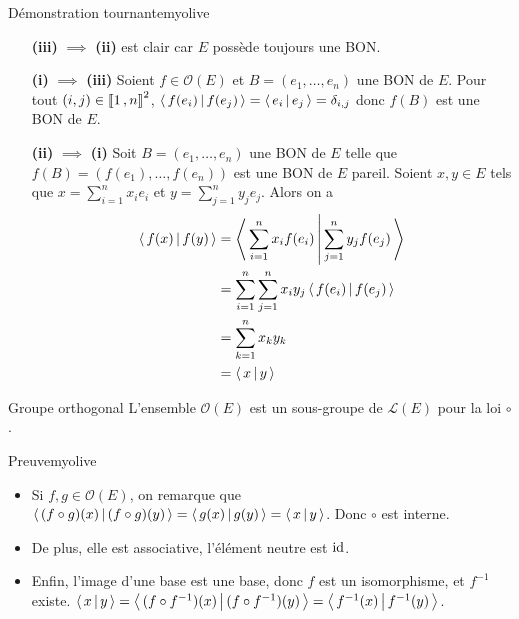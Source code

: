     \begin{demo}{Démonstration tournante}{myolive}
        \begin{itemize}[leftmargin=2cm]
            \item[\textbf{(iii)} $\implies$ \textbf{(ii)}] est clair car $E$ possède toujours une BON.
            \item[\textbf{(i)} $\implies$ \textbf{(iii)}] Soient $f \in \mathcal{O}(E)$ et $B = \left(e_1,\ldots,e_n\right)$ une BON de $E$. Pour tout $(i,j) \in \left\llbracket 1 \, , n \right\rrbracket^2$, $\left<\,f(e_i)\,\middle|\,f(e_j)\,\right> = \left<\,e_i\,\middle|\,e_j\,\right> = \delta_{i,j}$ donc $f(B)$ est une BON de $E$.
            \item[\textbf{(ii)} $\implies$ \textbf{(i)}] Soit $B = (e_1,\ldots,e_n)$ une BON de $E$ telle que $f(B) = \left(f(e_1), \ldots, f(e_n)\right)$ est une BON de $E$ pareil. Soient $x,y \in E$ tels que $x = \sum_{i=1}^{n} x_i e_i$ et $y = \sum_{j=1}^{n} y_j e_j$. Alors on a 
            \begin{align*}
                \left<\,f(x)\,\middle|\,f(y)\,\right> 
                &= \left<\,\sum_{i=1}^{n} x_i f(e_i)\,\middle|\,\sum_{j=1}^{n} y_j f(e_j)\,\right> \\
                &= \sum_{i=1}^{n} \sum_{j=1}^{n} x_i y_j \left<\,f(e_i)\,\middle|\,f(e_j)\,\right> \\
                &= \sum_{k=1}^{n} x_k y_k \\
                &= \left<\,x\,\middle|\,y\,\right>
            \end{align*}
        \end{itemize}
    \end{demo}

    \begin{prop}{Groupe orthogonal}{}
        L’ensemble $\mathcal{O}(E)$ est un sous-groupe de $\mathcal{L}(E)$ pour la loi $\circ$.
    \end{prop}

    \begin{demo}{Preuve}{myolive}
        \begin{itemize}
            \item Si $f,g \in \mathcal{O}(E)$, on remarque que $\left<\,(f \circ g)(x)\,\middle|\,(f \circ g)(y)\,\right> = \left<\,g(x)\,\middle|\,g(y)\,\right> = \left<\,x\,\middle|\,y\,\right>$. Donc $\circ$ est interne. 
            \item De plus, elle est associative, l’élément neutre est $\operatorname{id}$.
            \item Enfin, l’image d’une base est une base, donc $f$ est un isomorphisme, et $f^{-1}$ existe. $\left<\,x\,\middle|\,y\,\right> = \left<\,(f \circ f^{-1})(x)\,\middle|\,(f \circ f^{-1})(y)\,\right> = \left<\,f^{-1}(x)\,\middle|\,f^{-1}(y)\,\right>$.
        \end{itemize}
    \end{demo}

